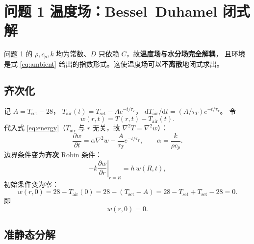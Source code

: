 \documentclass[11pt,a4paper]{article}
\theoremstyle{definition}
\begin{document}
\section{问题 1 温度场：Bessel--Duhamel 闭式解}
\label{sec:bessel}

问题 1 的 $\rho,c_p,k$ 均为常数、$D$ 只依赖 $C$，故\textbf{温度场与水分场完全解耦}，
且环境是式 \eqref{eq:ambient} 给出的指数形式。这使温度场可以\textbf{不离散}地闭式求出。

\subsection{齐次化}

记 $A=T_{\mathrm{set}}-28$，
$T_{\mathrm{air}}(t)=T_{\mathrm{set}}-Ae^{-t/\tau_T}$，
$\mathrm{d}T_{\mathrm{air}}/\mathrm{d}t=(A/\tau_T)e^{-t/\tau_T}$。
令
\[
w(r,t)=T(r,t)-T_{\mathrm{air}}(t).
\]
代入式 \eqref{eq:energy}（$T_{\mathrm{air}}$ 与 $r$ 无关，故 $\nabla^2T=\nabla^2w$）：
\begin{equation}
\frac{\partial w}{\partial t}=\alpha\nabla^2w-\frac{A}{\tau_T}e^{-t/\tau_T},
\qquad \alpha=\frac{k}{\rho c_p}.
\label{eq:w_pde}
\end{equation}
边界条件变为\textbf{齐次} Robin 条件：
\begin{equation}
-k\left.\frac{\partial w}{\partial r}\right|_{r=R}=h\,w(R,t),
\label{eq:w_bc}
\end{equation}
初始条件变为零：
\[
w(r,0)=28-T_{\mathrm{air}}(0)=28-(T_{\mathrm{set}}-A)=28-T_{\mathrm{set}}+T_{\mathrm{set}}-28=0 .
\]
即
\begin{equation}
w(r,0)=0 .
\label{eq:w_ic}
\end{equation}

\subsection{准静态分解}
\end{document}
